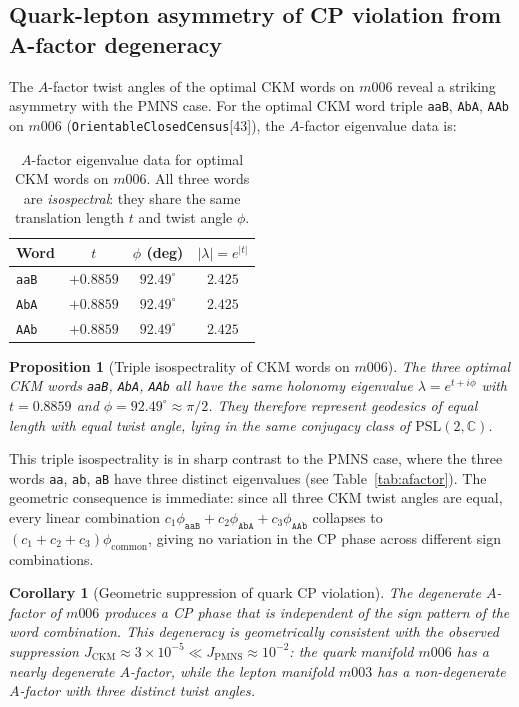 \documentclass[floatfix,aps,prd,twocolumn,showpacs,superscriptaddress,longbibliography]{revtex4-2}
\newtheorem{proposition}{Proposition}
\newtheorem{corollary}{Corollary}
\newcommand{\PSL}{\mathrm{PSL}(2,\mathbb{C})}
\begin{document}
\subsection{Quark-lepton asymmetry of CP violation from A-factor degeneracy}
\label{sec:ckm_afactor}

The $A$-factor twist angles of the optimal CKM words on $m006$
reveal a striking asymmetry with the PMNS case.
For the optimal CKM word triple \texttt{aaB}, \texttt{AbA}, \texttt{AAb}
on $m006$ (\texttt{OrientableClosedCensus}[43]), the $A$-factor
eigenvalue data is:

\begin{table}[h]
\centering
\caption{$A$-factor eigenvalue data for optimal CKM words on $m006$.
All three words are \emph{isospectral}: they share the same translation
length $t$ and twist angle $\phi$.}
\label{tab:ckm_afactor}
\begin{tabular}{lccc}
\toprule
Word & $t$ & $\phi$ (deg) & $|\lambda| = e^{|t|}$ \\
\midrule
\texttt{aaB} & $+0.8859$ & $92.49^\circ$ & $2.425$ \\
\texttt{AbA} & $+0.8859$ & $92.49^\circ$ & $2.425$ \\
\texttt{AAb} & $+0.8859$ & $92.49^\circ$ & $2.425$ \\
\bottomrule
\end{tabular}
\end{table}

\begin{proposition}[Triple isospectrality of CKM words on $m006$]
\label{prop:ckm_isospectral}
The three optimal CKM words \texttt{aaB}, \texttt{AbA}, \texttt{AAb}
all have the same holonomy eigenvalue $\lambda = e^{t+i\phi}$ with
$t = 0.8859$ and $\phi = 92.49^\circ \approx \pi/2$.
They therefore represent geodesics of equal length with equal twist
angle, lying in the same conjugacy class of $\PSL$.
\end{proposition}

This triple isospectrality is in sharp contrast to the PMNS case,
where the three words \texttt{aa}, \texttt{ab}, \texttt{aB} have
three distinct eigenvalues (see Table~\ref{tab:afactor}).
The geometric consequence is immediate: since all three CKM twist
angles are equal, every linear combination
$c_1\phi_{\texttt{aaB}} + c_2\phi_{\texttt{AbA}} + c_3\phi_{\texttt{AAb}}$
collapses to $(c_1+c_2+c_3)\phi_{\mathrm{common}}$, giving no
variation in the CP phase across different sign combinations.

\begin{corollary}[Geometric suppression of quark CP violation]
\label{cor:ckm_suppression}
The degenerate $A$-factor of $m006$ produces a CP phase that is
independent of the sign pattern of the word combination.
This degeneracy is geometrically consistent with the observed
suppression $J_{\mathrm{CKM}} \approx 3\times10^{-5} \ll
J_{\mathrm{PMNS}} \approx 10^{-2}$: the quark manifold $m006$
has a nearly degenerate $A$-factor, while the lepton manifold
$m003$ has a non-degenerate $A$-factor with three distinct
twist angles.
\end{corollary}
\end{document}
